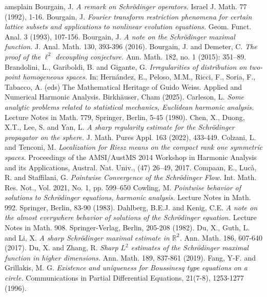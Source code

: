 \documentclass[12pt]{amsart}
\theoremstyle{definition}
\newcommand{\R}{\mathbb R}%
\numberwithin{equation}{section}
\begin{document}
\begin{thebibliography}{amsplain}
 Bourgain, J. {\em A remark on Schr\"odinger operators.} Israel J. Math. 77 (1992), 1-16.
 Bourgain, J. {\em Fourier transform restriction phenomena for certain lattice subsets and applications to nonlinear evolution equations.} Geom. Funct. Anal. 3 (1993), 107-156.
 Bourgain, J. {\em A note on the Schr\"odinger maximal function.} J. Anal. Math. 130, 393-396 (2016).
 Bourgain, J. and Demeter, C. {\em The proof of the $\ell^2$ decoupling conjecture.} Ann. Math. 182, no. 1 (2015): 351–89.
 Brandolini, L., Gariboldi, B. and Gigante, G. {\em Irregularities of distribution on two-point homogeneous spaces.} In: Hern\'andez, E., Peloso, M.M., Ricci, F., Soria, F., Tabacco, A. (eds) The Mathematical Heritage of Guido Weiss. Applied and Numerical Harmonic Analysis. Birkh\"auser, Cham (2025).
 Carleson, L. {\em Some analytic problems related to statistical mechanics, Euclidean harmonic analysis.} Lecture Notes in Math. 779, Springer, Berlin, 5-45 (1980).
 Chen, X., Duong, X.T., Lee, S. and Yan, L. {\em A sharp regularity estimate for the Schr\"odinger propagator on the sphere.} J. Math. Pures Appl. 163 (2022), 433-449.
 Colzani, L. and Tenconi, M. {\em 
Localization for Riesz means on the compact rank one symmetric spaces.} Proceedings of the AMSI/AustMS 2014 Workshop in Harmonic Analysis and its Applications, Austral. Nat. Univ., (47) 26–49,  2017.
 Compaan, E., Luc\`a, R. and Staffilani, G. {\em Pointwise Convergence of the Schr\"odinger Flow.}
Int. Math. Res. Not., Vol. 2021, No. 1, pp. 599–650
 Cowling, M. {\em Pointwise behavior of solutions to Schr\"odinger equations, harmonic analysis.} Lecture Notes in Math. 992. Springer, Berlin, 83-90 (1983).
 Dahlberg, B.E.J. and Kenig, C.E. {\em A note on the almost everywhere behavior of solutions of the Schr\"odinger equation.} Lecture Notes in Math. 908. Springer-Verlag, Berlin, 205-208 (1982).
 Du, X., Guth, L. and Li, X. {\em A sharp Schr\"odinger maximal estimate in $\R^2$.} Ann. Math. 186, 607-640 (2017).
 Du, X. and Zhang, R. {\em Sharp $L^2$ estimates of the Schr\"odinger maximal function in higher dimensions.} Ann. Math. 189, 837-861 (2019).
 Fang, Y-F. and Grillakis, M. G. {\em Existence and uniqueness for Boussinesq type equations on a circle.} Communications in Partial Differential Equations, 21(7-8), 1253-1277 (1996).

\end{thebibliography}
\end{document}
